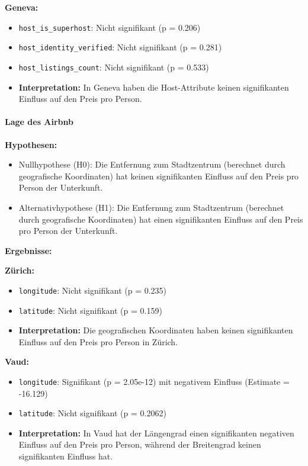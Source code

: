 \documentclass[
  journal,
]{IEEEtran}%
\let\oldparagraph\paragraph
\renewcommand{\paragraph}[1]{\oldparagraph{#1}\mbox{}}
\providecommand{\tightlist}{%
  \setlength{\itemsep}{0pt}\setlength{\parskip}{0pt}}\usepackage{longtable,booktabs,array}
\begin{document}
\textbf{Geneva:}

\begin{itemize}
\item
  \texttt{host\_is\_superhost}: Nicht signifikant (p = 0.206)
\item
  \texttt{host\_identity\_verified}: Nicht signifikant (p = 0.281)
\item
  \texttt{host\_listings\_count}: Nicht signifikant (p = 0.533)
\item
  \textbf{Interpretation:} In Geneva haben die Host-Attribute keinen
  signifikanten Einfluss auf den Preis pro Person.
\end{itemize}

\hypertarget{lage-des-airbnb}{%
\paragraph{Lage des Airbnb}\label{lage-des-airbnb}}

\textbf{Hypothesen:}

\begin{itemize}
\tightlist
\item
  Nullhypothese (H0): Die Entfernung zum Stadtzentrum (berechnet durch
  geografische Koordinaten) hat keinen signifikanten Einfluss auf den
  Preis pro Person der Unterkunft.
\item
  Alternativhypothese (H1): Die Entfernung zum Stadtzentrum (berechnet
  durch geografische Koordinaten) hat einen signifikanten Einfluss auf
  den Preis pro Person der Unterkunft.
\end{itemize}

\textbf{Ergebnisse:}

\textbf{Zürich:}

\begin{itemize}
\item
  \texttt{longitude}: Nicht signifikant (p = 0.235)
\item
  \texttt{latitude}: Nicht signifikant (p = 0.159)
\item
  \textbf{Interpretation:} Die geografischen Koordinaten haben keinen
  signifikanten Einfluss auf den Preis pro Person in Zürich.
\end{itemize}

\textbf{Vaud:}

\begin{itemize}
\item
  \texttt{longitude}: Signifikant (p = 2.05e-12) mit negativem Einfluss
  (Estimate = -16.129)
\item
  \texttt{latitude}: Nicht signifikant (p = 0.2062)
\item
  \textbf{Interpretation:} In Vaud hat der Längengrad einen
  signifikanten negativen Einfluss auf den Preis pro Person, während der
  Breitengrad keinen signifikanten Einfluss hat.
\end{itemize}
\end{document}
